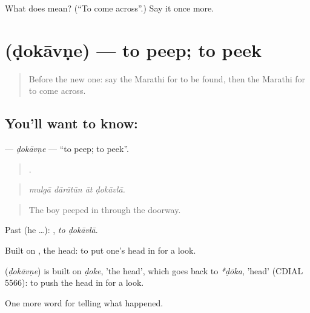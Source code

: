\begin{tcolorbox}[breakable,colback=teal!4,colframe=teal!35!black,title={Before you move on}]
What does  mean? (\textquotedblleft{}To come across\textquotedblright{}.) Say it once more.
\end{tcolorbox}
\section[\texorpdfstring{\mr{डोकावणे} (ḍokāvṇe)}{डोकावणे (ḍokāvṇe)}]{ (ḍokāvṇe) — to peep; to peek}

\label{lesson:MR-C301-dokavne}



\begin{quote}
Before the new one: say the Marathi for to be found, then the Marathi for to come across.
\end{quote}

\subsection*{You'll want to know: }
\textbf{} — \emph{ḍokāvṇe} — \textquotedblleft{}to peep; to peek\textquotedblright{}.

\begin{quote}
   .
\end{quote}

\begin{quote}
\emph{mulgā dārātūn āt ḍokāvlā.}
\end{quote}

\begin{quote}
The boy peeped in through the doorway.
\end{quote}

Past (he …):  , \emph{to ḍokāvlā}.

Built on , the head: to put one's head in for a look.

\begin{cousinweb}
\textbf{} (\emph{ḍokāvṇe}) is built on \emph{ḍoke}, 'the head', which goes back to \emph{*ḍōka}, 'head' (CDIAL 5566): to push the head in for a look.
\end{cousinweb}

\begin{grammarlens}[title={What you've built}]
One more word for telling what happened.
\end{grammarlens}

